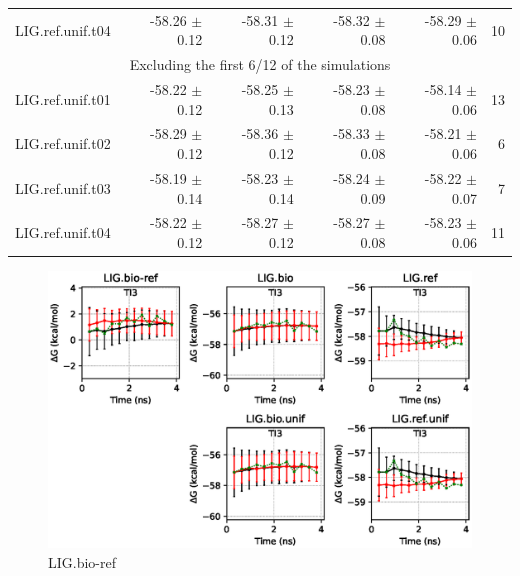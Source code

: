 \documentclass[journal=jctcce,manuscript=article,hyperref=false]{achemso}
\begin{document}
\begin{table}
{\begin{tabular}{l r r r r r}
                        LIG.ref.unif.t04 &  -58.26 $\pm$    0.12 &  -58.31 $\pm$    0.12 &  -58.32 $\pm$    0.08 &  -58.29 $\pm$    0.06 &      10 \\
\multicolumn{6}{c}{Excluding the first 6/12 of the simulations} \\
                        LIG.ref.unif.t01 &  -58.22 $\pm$    0.12 &  -58.25 $\pm$    0.13 &  -58.23 $\pm$    0.08 &  -58.14 $\pm$    0.06 &      13 \\
                        LIG.ref.unif.t02 &  -58.29 $\pm$    0.12 &  -58.36 $\pm$    0.12 &  -58.33 $\pm$    0.08 &  -58.21 $\pm$    0.06 &       6 \\
                        LIG.ref.unif.t03 &  -58.19 $\pm$    0.14 &  -58.23 $\pm$    0.14 &  -58.24 $\pm$    0.09 &  -58.22 $\pm$    0.07 &       7 \\
                        LIG.ref.unif.t04 &  -58.22 $\pm$    0.12 &  -58.27 $\pm$    0.12 &  -58.27 $\pm$    0.08 &  -58.23 $\pm$    0.06 &      11 \\

\hline
\end{tabular}
}
\end{table}

\clearpage
\pagebreak
\begin{figure}
\centering
\includegraphics[clip,width=6in]{LIG.bio-ref.GvsT.eps}
\caption{LIG.bio-ref}
\end{figure}
\end{document}
